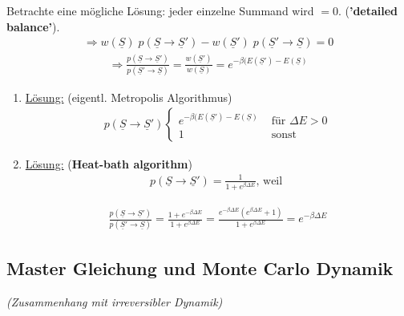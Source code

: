 \documentclass[12pt]{article}
\begin{document}

Betrachte eine mögliche Lösung: jeder einzelne Summand wird $=0$. (\textbf{'detailed balance'}).
 \begin{align}
\Rightarrow   w(\underline{S}) \; p(\underline{S} \rightarrow \underline{S}')- w(\underline{S}') \; p(\underline{S}' \rightarrow \underline{S}) =0 
\end{align}
\begin{align}
\Rightarrow  \frac{p(\underline{S} \rightarrow \underline{S}')}{p(\underline{S}' \rightarrow  \underline{S})} = \frac{w(\underline{S}')}{w(\underline{S})} = e^{-\beta(E(\underline{S}')- E(\underline{S})}
\end{align}
\begin{enumerate}
\item \underline{Lösung:} (eigentl. Metropolis Algorithmus)
 \begin{align}
p(\underline{S} \rightarrow \underline{S}')
\begin{cases}
e^{-\beta(E(\underline{S}')- E(\underline{S})} & \text{ für } \Delta E > 0 \\
1 & \text{ sonst}
\end{cases}
\end{align} 

\item \underline{Lösung:} (\textbf{Heat-bath algorithm})
\begin{align*}
p(\underline{S} \rightarrow \underline{S}') = \frac{1}{1+ e^{\beta \Delta E}} \mbox{, weil } 
\end{align*}

\begin{align*}
\frac{p(\underline{S} \rightarrow \underline{S}')}{p(\underline{S}' \rightarrow \underline{S})} = \frac{1+e^{-\beta \Delta E} }{1+e^{\beta \Delta E}} = \frac{e^{-\beta \Delta E} (e^{\beta \Delta E}+1)}{1+e^{\beta \Delta E}}= e^{-\beta \Delta E}
\end{align*}
\end{enumerate}


\subsection{Master Gleichung und Monte Carlo Dynamik}
\textit{(Zusammenhang mit irreversibler Dynamik)}\\
\end{document}
